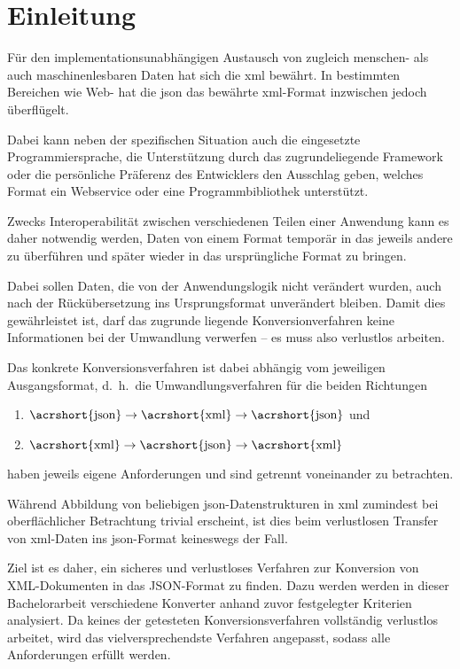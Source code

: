 \chapter{Einleitung} \label{chap:intro}

Für den implementationsunabhängigen Austausch von zugleich menschen- als auch
maschinenlesbaren Daten hat sich die \gls{xml}
bewährt. In bestimmten Bereichen wie Web- hat die \gls{json}
das bewährte \acrshort{xml}-Format inzwischen jedoch überflügelt.

Dabei kann neben der spezifischen Situation auch die eingesetzte
Programmiersprache, die Unterstützung durch das zugrundeliegende Framework
oder die persönliche Präferenz des Entwicklers den Ausschlag geben, welches
Format ein Webservice oder eine Programmbibliothek unterstützt.

Zwecks Interoperabilität zwischen verschiedenen Teilen einer Anwendung kann es
daher notwendig werden, Daten von einem Format temporär in das jeweils andere
zu überführen und später wieder in das ursprüngliche Format zu bringen.

Dabei sollen Daten, die von der Anwendungslogik nicht verändert wurden, auch
nach der Rückübersetzung ins Ursprungsformat unverändert bleiben. Damit dies
gewährleistet ist, darf das zugrunde liegende Konversionverfahren keine
Informationen bei der Umwandlung verwerfen -- es muss also verlustlos %
arbeiten.

Das konkrete Konversionsverfahren ist dabei abhängig vom jeweiligen
Ausgangsformat, d.~h.\ die Umwandlungsverfahren für die beiden Richtungen
\begin{enumerate}
    \item $\text{\acrshort{json}} \rightarrow \text{\acrshort{xml}} \rightarrow \text{\acrshort{json}}$ und
    \item $\text{\acrshort{xml}} \rightarrow \text{\acrshort{json}} \rightarrow \text{\acrshort{xml}}$
\end{enumerate}
haben jeweils eigene Anforderungen und sind getrennt voneinander zu betrachten.

Während Abbildung von beliebigen \acrshort{json}-Datenstrukturen in \acrshort{xml} zumindest bei
oberflächlicher Betrachtung trivial erscheint, ist dies beim verlustlosen
Transfer von \acrshort{xml}-Daten ins \acrshort{json}-Format keineswegs der Fall.

Ziel ist es daher, ein sicheres und verlustloses Verfahren zur Konversion von
XML-Dokumenten in das JSON-Format zu finden. Dazu werden werden in dieser
Bachelorarbeit verschiedene Konverter anhand zuvor festgelegter Kriterien
analysiert. Da keines der getesteten Konversionsverfahren vollständig
verlustlos arbeitet, wird das vielversprechendste Verfahren angepasst,
sodass alle Anforderungen erfüllt werden.

